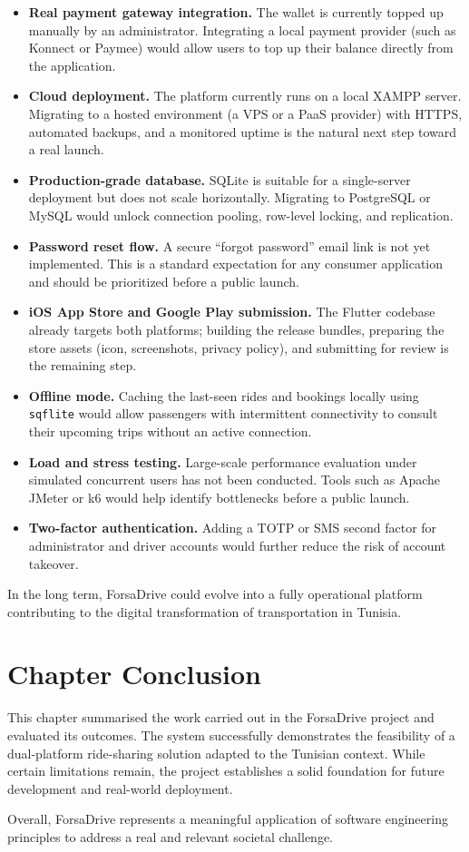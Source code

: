 \begin{itemize}[noitemsep]
    \item \textbf{Real payment gateway integration.} The wallet is currently topped up manually by an administrator. Integrating a local payment provider (such as Konnect or Paymee) would allow users to top up their balance directly from the application.
    \item \textbf{Cloud deployment.} The platform currently runs on a local XAMPP server. Migrating to a hosted environment (a VPS or a PaaS provider) with HTTPS, automated backups, and a monitored uptime is the natural next step toward a real launch.
    \item \textbf{Production-grade database.} SQLite is suitable for a single-server deployment but does not scale horizontally. Migrating to PostgreSQL or MySQL would unlock connection pooling, row-level locking, and replication.
    \item \textbf{Password reset flow.} A secure ``forgot password'' email link is not yet implemented. This is a standard expectation for any consumer application and should be prioritized before a public launch.
    \item \textbf{iOS App Store and Google Play submission.} The Flutter codebase already targets both platforms; building the release bundles, preparing the store assets (icon, screenshots, privacy policy), and submitting for review is the remaining step.
    \item \textbf{Offline mode.} Caching the last-seen rides and bookings locally using \texttt{sqflite} would allow passengers with intermittent connectivity to consult their upcoming trips without an active connection.
    \item \textbf{Load and stress testing.} Large-scale performance evaluation under simulated concurrent users has not been conducted. Tools such as Apache JMeter or k6 would help identify bottlenecks before a public launch.
    \item \textbf{Two-factor authentication.} Adding a TOTP or SMS second factor for administrator and driver accounts would further reduce the risk of account takeover.
\end{itemize}

In the long term, ForsaDrive could evolve into a fully operational platform contributing to the digital transformation of transportation in Tunisia.

\section*{Chapter Conclusion}

This chapter summarised the work carried out in the ForsaDrive project and evaluated its outcomes. The system successfully demonstrates the feasibility of a dual-platform ride-sharing solution adapted to the Tunisian context. While certain limitations remain, the project establishes a solid foundation for future development and real-world deployment.

Overall, ForsaDrive represents a meaningful application of software engineering principles to address a real and relevant societal challenge.